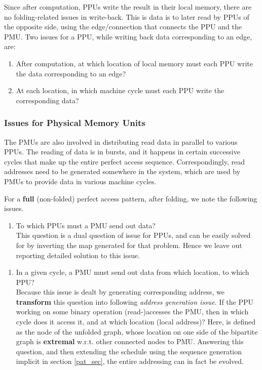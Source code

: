 \documentclass[12pt]{article}
\newcounter{saveissueFi}
\newcounter{saveissueMi}
\begin{document}
Since after computation, PPUs write the result in their local
memory, there are no folding-related issues in
write-back. This is data is to later read by PPUs
of the opposite side, using the edge/connection that connects the PPU and
the PMU. Two issues for a PPU, while writing back data corresponding to an
edge, are:
\begin{enumerate}
\setcounter{enumi}{\thesaveissueFi}
\item After computation, at which location of local memory must each
PPU write the data corresponding to an edge?
\item At each location, in which machine cycle must each PPU
      write the corresponding data?
\end{enumerate}

\subsubsection{Issues for Physical Memory Units}
\label{missues_sec}
The PMUs are also
involved in distributing read data in parallel to various
PPUs. The reading of data is in bursts, and it happens in
certain successive cycles that make up the entire perfect access sequence.
Correspondingly, read addresses need to be generated somewhere in the
system, which are used by PMUs to provide data in various machine
cycles.

For a \textbf{full} (non-folded) perfect access pattern, after folding, we note the
following issues.
\begin{enumerate}
        \item To which PPUs must a PMU send out data?
\setcounter{saveissueMi}{\theenumi}
\\
This question is a dual question of 
issue for PPUs, and can be easily solved for by
inverting the map generated for that problem. Hence we leave out
reporting detailed solution to this issue.
\end{enumerate}
\begin{enumerate}
\setcounter{enumi}{\thesaveissueMi}
\item In a given cycle, a PMU must send out
data from which location, to which PPU? \\
Because this issue is dealt by generating
corresponding address, we \textbf{transform} this question into following
\textit{address generation issue}. If the PPU  working
on some binary operation (read-)accesses the  PMU, then in which
cycle does it access it, and at which location (local address)? Here,
 is defined as the node of the unfolded graph, whose location
on one side of the bipartite graph is
\textbf{extremal} w.r.t. other
connected nodes to  PMU. Answering this question,
and then extending the schedule using the sequence generation implicit in
section \ref{pat_sec}, the entire addressing can in fact be evolved.
\end{enumerate}
\end{document}
